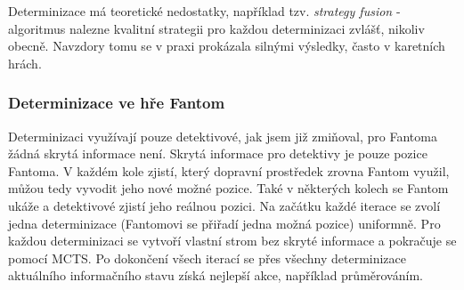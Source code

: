 Determinizace má teoretické nedostatky, například tzv. {\it strategy fusion} \cite{Soete2013MonteCarloTS} - algoritmus nalezne kvalitní strategii pro každou determinizaci zvlášť, nikoliv obecně. Navzdory tomu se v praxi prokázala silnými výsledky, často v karetních hrách.

\subsubsection{Determinizace ve hře Fantom}
Determinizaci využívají pouze detektivové, jak jsem již zmiňoval, pro Fantoma žádná skrytá informace není. 
Skrytá informace pro detektivy je pouze pozice Fantoma. V každém kole zjistí, který dopravní prostředek zrovna Fantom využil, můžou tedy vyvodit jeho nové možné pozice. Také v některých kolech se Fantom ukáže a detektivové zjistí jeho reálnou pozici.  
Na začátku každé iterace se zvolí jedna determinizace (Fantomovi se přiřadí jedna možná pozice) uniformně. Pro každou determinizaci se vytvoří vlastní strom bez skryté informace a pokračuje se pomocí MCTS. Po dokončení všech iterací se přes všechny determinizace aktuálního informačního stavu získá nejlepší akce, například průměrováním. 









